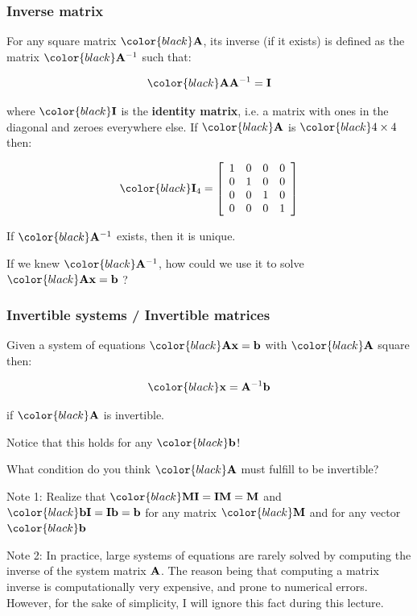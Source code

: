 \documentclass[compress]{beamer}
\newcommand{\black}[1]{{\color{black}#1}}
\renewcommand{\emph}[1]{\textbf{\black{#1}}}
\newcommand{\beq}[1]{\[\black{#1}\]}
\begin{document}
\begin{frame}
\frametitle{Inverse matrix}


For any square matrix $\black{\A}$, its inverse (if it exists) is defined as the matrix $\black{\A^{-1}}$ such that:

\beq{
\A\A^{-1}=\I
}

where $\black{\I}$ is the \emph{identity matrix}, i.e. a matrix with ones in the diagonal and zeroes everywhere else. If $\black{\A}$ is $\black{4\times 4}$ then:

\beq{
\I_{4} = \left[
\begin{array}{cccc}
1 & 0 & 0 & 0\\
0 & 1 & 0 & 0\\
0 & 0 & 1 & 0\\
0 & 0 & 0 & 1
\end{array}
\right]
}

\vspace{.5cm}
If $\black{\A^{-1}}$ exists, then it is unique.

\vspace{.5cm}
If we knew $\black{\A^{-1}}$, how could we use it to solve $\black{\A\x=\b}$ ?

\end{frame}



\begin{frame}
\frametitle{Invertible systems / Invertible matrices}

\vspace{.5cm}

\small

Given a system of equations $\black{\A\x=\b}$ with $\black{\A}$ square then: 

\beq{
\x = \A^{-1}\b
}

if $\black{\A}$ is invertible. 

\vspace{.5cm}
Notice that this holds for any $\black{\b}$!

\vspace{.5cm}
What condition do you think $\black{\A}$ must fulfill to be invertible?

\vspace{1.5cm}

\tiny{\black{Note 1:} Realize that $\black{\M\I=\I\M=\M}$ and $\black{\b\I=\I\b=\b}$ for any matrix $\black{\M}$ and for any vector $\black{\b}$}

\vspace{.2cm}

\tiny{\black{Note 2:} In practice, large systems of equations are rarely solved by computing the inverse of the system matrix ${\mathbf A}$. The reason being that computing a matrix inverse is computationally very expensive, and prone to numerical errors. However, for the sake of simplicity, I will ignore this fact during this lecture.}


\end{frame}
\end{document}
